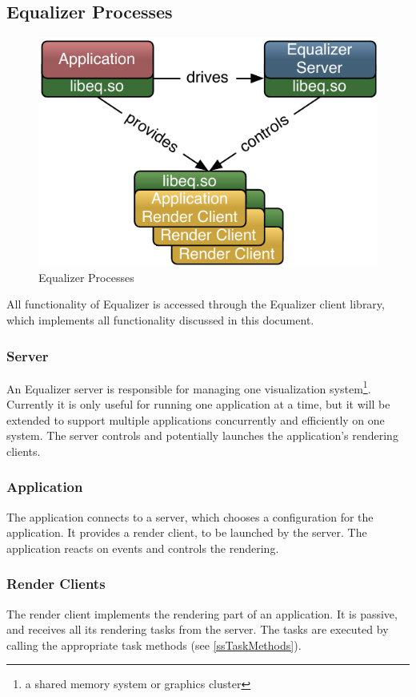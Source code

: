 \documentclass[10pt,a4]{scrartcl}
\begin{document}
\subsection{Equalizer Processes}

\begin{figure}
  \includegraphics[width=.4\textwidth]{images/processes.pdf}
  {\caption{\small\label{fProcesses}Equalizer Processes}}
\end{figure}
All functionality of Equalizer is accessed through the Equalizer client
library, which implements all functionality discussed in this document.

\subsubsection{Server}

An Equalizer server is responsible for managing one visualization
system\footnote{a shared memory system or graphics cluster}. Currently
it is only useful for running one application at a time, but it will be
extended to support multiple applications concurrently and efficiently
on one system. The server controls and potentially launches the
application's rendering clients.

\subsubsection{Application}

The application connects to a server, which chooses a configuration for
the application. It provides a render client, to be launched by the
server. The application reacts on events and controls the rendering.

\subsubsection{Render Clients}

The render client implements the rendering part of an application. It is
passive, and receives all its rendering tasks from the server. The tasks
are executed by calling the appropriate task methods (see
\ref{ssTaskMethods}).
\end{document}
